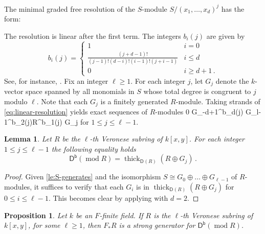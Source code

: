 \documentclass{amsart}
\let\oldequation\equation
\let\oldendequation\endequation
\renewenvironment{equation}{\linenomathNonumbers\oldequation}{\oldendequation\endlinenomath}
\newcommand{\dcat}[2][]{\cat{D}_{#1}(#2)}
\newcommand{\dbcat}[1]{\cat{D}^{\mathsf{b}}(#1)}
\newcommand{\cat}[1]{{\mathsf{#1}}}
\newcommand{\rmod}{\operatorname{mod}}
\newcommand{\thick}{\operatorname{thick}}
\newtheorem{proposition}[subsection]{Proposition}
\newtheorem{lemma}[subsection]{Lemma}
\theoremstyle{definition}
\theoremstyle{remark}
\numberwithin{equation}{subsection}
\begin{document}
The minimal graded free resolution of the $S$-module $S/(x_1, \ldots, x_d)^j$ has the form:
\begin{equation}
\label{eq:linear-resolution}
\end{equation}
The resolution is linear after the first term. The integers $b_i(j)$ are given by
\[
b_i(j) =
\begin{cases}
1 & i=0\\
\frac{(j+d-1)!}{(j-1)!(d-i)!(i-1)!(j+i-1)} & i \leq d \\
0 & i\ge d+1\,.
\end{cases}
\]
See, for instance, \cite{Buchsbaum/Eisenbud:1975}. Fix an integer $\ell\ge 1$. For each integer $j$, let $G_j$ denote the $k$-vector space spanned by all monomials in $S$ whose total degree is congruent to $j$ modulo $\ell$. Note that each $G_j$ is a finitely generated $R$-module. 
Taking strands of \cref{eq:linear-resolution} yields exact sequences of $R$-modules 
\begin{equation}\label{eq:exact-sequence-strands}
 0 \rightarrow G_{\ell-d+1}^{\oplus b_d(j)} \rightarrow \cdots G_{l-1}^{\oplus b_2(j)}\rightarrow R^{\oplus b_1(j)} \rightarrow G_j 
 \end{equation}
 for $1 \leq j \leq \ell -1$.

\begin{lemma}
\label{le:veronsese-generators}
Let $R$ be the $\ell$-th Veronese subring of $k[x,y]$. For each integer $1\le j\le \ell-1$ the following equality holds
 \[
 \dbcat{\rmod R}= \thick_{\dcat R} (R\oplus G_j)\,.
 \]
 \end{lemma}

\begin{proof}
Given \cref{le:S-generates} and the isomorphism $S \cong G_0\oplus \ldots \oplus G_{\ell-1}$
of $R$-modules, it suffices to verify that each $G_i$ is in $\thick_{\dcat R}(R\oplus G_j)$ for $0\le i\le \ell-1$. This becomes clear by applying  with $d=2$.
\end{proof}

\begin{proposition}
\label{pr:veronese}
Let $k$ be an $F $-finite field. If $R$ is the $\ell$-th Veronese subring of $k[x,y]$, for some $\ell \ge 1$, then $F _*R$ is a strong generator for $\dbcat{\rmod R}$. 
\end{proposition}
\end{document}

